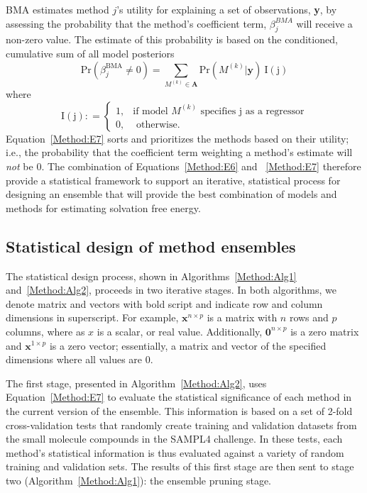 \documentclass[journal=jpcbfk, manuscript=article]{achemso}
\newcommand{\+}[1]{\ensuremath{\mathbf{#1}}}
\newcommand{\rev}[1]{#1}
\begin{document}
BMA estimates method $j$'s utility for explaining a set of observations, \textbf{y}, by assessing the probability that the method's coefficient term, $\beta^{BMA}_j$ will receive a non-zero value.
The estimate of this probability is based on the conditioned, cumulative sum of all model posteriors
\begin{equation} \label{Method:E7} 
	\mathrm{Pr}(\beta_j^{\text{BMA}}\neq 0) =   \sum_{M^{(k)}\in\mathbf{A}} {\mathrm{Pr}}(M^{(k)} | \textbf{y}) \:{\mathrm{I(j)}}
\end{equation}
where
\begin{equation} \label{eq:bma-prob-neq0-ID}
	\mathrm{I(j)}: =
	\begin{cases} 
		1,&\text{if model $M^{(k)}$ specifies j as a regressor} \\
		0,&\text{ otherwise}.
	\end{cases}
\end{equation}
Equation~\ref{Method:E7} \rev{sorts and prioritizes} the methods based on their utility; i.e., the probability that the coefficient term weighting a method's estimate will \emph{not} be 0.
The combination of Equations~\ref{Method:E6} and ~\ref{Method:E7} therefore provide a statistical framework to support an iterative, statistical process for designing an ensemble that will provide the best combination of models and methods for estimating solvation free energy.

\subsection{\rev{Statistical design of method ensembles}}
 \label{Method:StatEnsemble:Design}
\rev{The statistical design process, shown in Algorithms~\ref{Method:Alg1} and~\ref{Method:Alg2}, proceeds in two iterative stages. 
In both algorithms, we denote matrix and vectors with bold script and indicate row and column dimensions in superscript.
For example, $\textbf{x}^{n \times p}$ is a matrix with $n$ rows and $p$ columns, where as $x$ is a scalar, or real value.
Additionally,  $\textbf{0}^{n \times p}$ is a zero matrix and  $\textbf{x}^{1 \times p}$ is a zero vector; essentially, a matrix and vector of the specified dimensions where all values are 0.}

\rev{The first stage, presented in Algorithm~\ref{Method:Alg2}, uses Equation~\ref{Method:E7} to evaluate the statistical significance of each method in the current version of the ensemble.
This information is based on a set of 2-fold cross-validation tests that randomly create training and validation datasets from the small molecule compounds  in the SAMPL4 challenge.
In these tests, each method's statistical information is thus evaluated against a variety of random training and validation sets.
The results of this first stage are then sent to stage two (Algorithm~\ref{Method:Alg1}): the ensemble pruning stage.}
\end{document}
